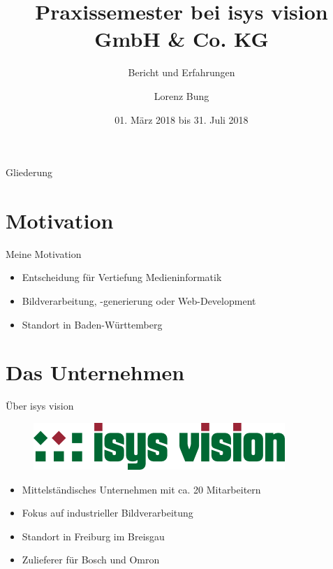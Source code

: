 \documentclass[xcolor=dvipsnames]{beamer}
\title[PSS isys vision]{Praxissemester bei isys vision GmbH \& Co. KG}
\subtitle{Bericht und Erfahrungen}
\author{Lorenz Bung}
\date{01. März 2018 bis 31. Juli 2018}
\begin{document}
\frame{\titlepage}
\begin{frame}{Gliederung}
\tableofcontents
\end{frame}


\section{Motivation}

\begin{frame}{Meine Motivation}
\begin{itemize}
\item Entscheidung für Vertiefung Medieninformatik
\item Bildverarbeitung, -generierung oder Web-Development
\item Standort in Baden-Württemberg
\end{itemize}
\end{frame}


\section{Das Unternehmen}

\begin{frame}{Über isys vision}
\begin{figure}[t]
\includegraphics[height=0.1\textheight]{media/isys.png}
\end{figure}
\begin{itemize}
\item Mittelständisches Unternehmen mit ca. 20 Mitarbeitern
\item Fokus auf industrieller Bildverarbeitung
\item Standort in Freiburg im Breisgau
\item Zulieferer für Bosch und Omron
\end{itemize}
\end{frame}
\end{document}
